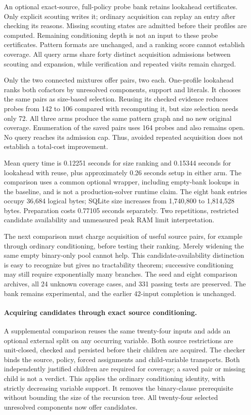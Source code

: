 \documentclass[11pt,a4paper]{article}
\numberwithin{equation}{section}
\theoremstyle{plain}
\theoremstyle{definition}
\theoremstyle{remark}
\begin{document}
An optional exact-source, full-policy probe bank retains lookahead certificates.
Only explicit scouting writes it; ordinary acquisition can replay an entry after
checking its reasons. Missing scouting states are admitted before their profiles
are computed. Remaining conditioning depth is not an input to these probe
certificates. Pattern formats are unchanged, and a ranking score cannot establish
coverage. All query arms share forty distinct acquisition admissions between
scouting and expansion, while verification and repeated visits remain charged.

Only the two connected mixtures offer pairs, two each. One-profile lookahead
ranks both cofactors by unresolved components, support and literals. It chooses
the same pairs as size-based selection. Reusing its checked evidence reduces
probes from 142 to 106 compared with recomputing it, but size selection needs only
72. All three arms produce the same pattern graph and no new original coverage.
Enumeration of the saved pairs uses 164 probes and also remains open. No query
reaches its admission cap. Thus, avoided repeated acquisition does not establish
a total-cost improvement.

Mean query time is 0.12251 seconds for size ranking and 0.15344 seconds for
lookahead with reuse, plus approximately 0.26 seconds setup in either arm.
The comparison uses a common optional wrapper, including empty-bank lookups in
the baseline, and is not a production-solver runtime claim. The eight bank entries
occupy 36,684 logical bytes; SQLite size increases from 1,740,800 to 1,814,528
bytes. Preparation costs 0.77105 seconds separately. Two repetitions, restricted
candidate availability and unmeasured peak RAM limit interpretation.

The next comparison must charge acquisition of useful source pairs, for example
through ordinary conditioning, before testing their ranking. Merely widening the
same empty binary-only pool cannot help. This candidate-availability distinction
is easy to recognize but gives no tractability theorem; successive conditioning
may still require exponentially many branches. The seed and eight comparison
archives, all 24 unknown coverage cases, and 331 passing tests are preserved.
The bank remains experimental, and the earlier 42-input completion is unchanged.

\paragraph{Acquiring candidates through exact source conditioning.}
A supplemental comparison reuses the same twenty-four inputs and adds an
optional external split on any occurring variable. Both source restrictions are
unit-closed, checked and persisted before their children are acquired. The
checker binds the source, policy, forced assignments and child-variable
transports. Both independently justified children are required for coverage;
a saved pair or missing child is not a verdict. This applies the ordinary
conditioning identity, with strictly decreasing variable support. It removes
the binary-clause prerequisite without bounding the size of the recursion tree.
All twenty-four selected unresolved components now offer candidates.
\end{document}
